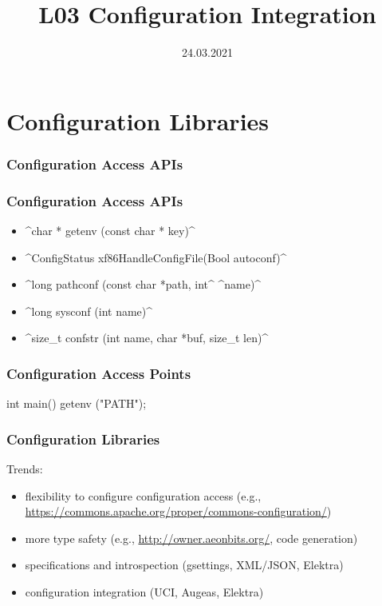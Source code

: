 

\title{L03 Configuration Integration}
\date{24.03.2021}



\section{Configuration Libraries}


\begin{frame}
	\frametitle{Configuration Access APIs}

	\Large

\end{frame}

\begin{frame}[fragile]
	\frametitle{Configuration Access APIs}

	\begin{itemize}[<+-| alert@+>]
	\item ^char * getenv (const char * key)^
	\item ^ConfigStatus xf86HandleConfigFile(Bool autoconf)^
	\item ^long pathconf (const char *path, int^ ^name)^
	\item ^long sysconf (int name)^
	\item ^size_t confstr (int name, char *buf, size_t len)^
	\end{itemize}
\end{frame}

\begin{frame}[fragile]
	\frametitle{Configuration Access Points}

	\begin{code}[language=Cpp,gobble=4,showspaces=no]
	int main()
	{
		getenv ("PATH");
	}
	\end{code}
\end{frame}

\begin{frame}[fragile]
	\frametitle{Configuration Libraries}

	Trends:
	\begin{itemize}[<+-| alert@+>]
	\item flexibility to configure configuration access (e.g., \url{https://commons.apache.org/proper/commons-configuration/})
	\item more type safety (e.g., \url{http://owner.aeonbits.org/}, code generation)
	\item specifications and introspection (gsettings, XML/JSON, Elektra)
	\item configuration integration (UCI, Augeas, Elektra)
	\end{itemize}
\end{frame}

